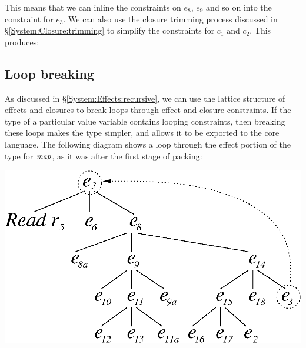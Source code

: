 This means that we can inline the constraints on $e_8$, $e_9$ and so on into the constraint for $e_3$. We can also use the closure trimming process discussed in \S\ref{System:Closure:trimming} to simplify the constraints for $c_1$ and $c_2$. This produces:

\bigskip
{}


\subsection{Loop breaking}
\label{Inference:Generalisation:loop-breaking}
As discussed in \S\ref{System:Effects:recursive}, we can use the lattice structure of effects and closures to break loops through effect and closure constraints. If the type of a particular value variable contains looping constraints, then breaking these loops makes the type simpler, and allows it to be exported to the core language. The following diagram shows a loop through the effect portion of the type for $\operatorname{\mathit{map}}$, as it was after the first stage of packing:

\begin{center}
\includegraphics[scale=0.5]{3-Inference/fig/generalisation/loop-effect}
\end{center}

